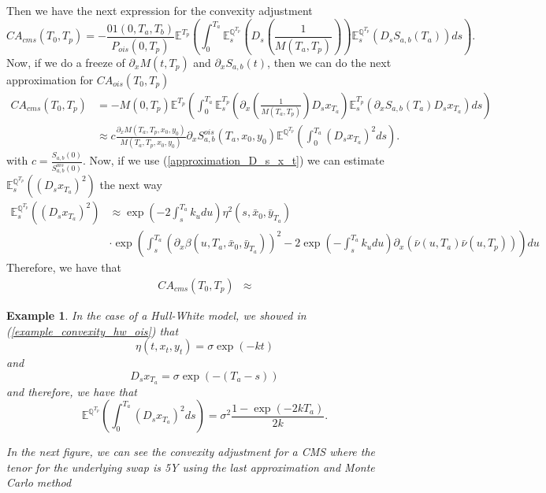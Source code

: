 \documentclass[a4paper,10pt]{article}
\newtheorem{example}[theorem]{Example}
\newcommand{\1}{\mathbf{1}}
\begin{document}
Then we have the next expression for the convexity adjustment
\begin{equation*}
CA_{cms}(T_0,T_p) = - \frac{01(0,T_a,T_b)}{P_{ois}(0,T_p)} \mathbb{E}^{T_p}\left(\int_{0}^{T_a} \mathbb{E}_s^{\mathbb{Q}^{T_p}}\left(D_s \left(\frac{1}{M(T_a,T_p)}\right)\right) \mathbb{E}_s^{\mathbb{Q}^{T_p}}\left(D_s S_{a,b}(T_a)\right) ds  \right).
\end{equation*}
Now, if we do a freeze of $\partial_x M(t,T_p)$ and $\partial_x S_{a,b}(t)$, then we can do the next approximation for $CA_{ois}(T_0,T_p)$
\begin{align*}
CA_{cms}(T_0,T_p) &=  - M(0,T_p) \mathbb{E}^{T_p}\left(\int_{0}^{T_a} \mathbb{E}^{T_p}_s \left(\partial_x \left(\frac{1}{M(T_a,T_p)}\right) D_s x_{T_a}\right) \mathbb{E}^{T_p}_s \left(\partial_x S_{a,b}(T_a)D_s x_{T_a} \right) ds \right) \\
& \approx c \frac{ \partial_x M(T_a,T_p, x_0, y_0)}{M(T_a,T_p, x_0, y_0)}  \partial_x S^{ois}_{a,b}(T_a,x_0,y_0) \mathbb{E}^{\mathbb{Q}^{T_p}}\left(\int_{0}^{T_a} \left(D_s x_{T_a} \right)^{2} ds \right).
\end{align*}
with $c = \frac{S_{a,b}(0)}{S^{ois}_{a,b}(0)}$. Now, if we use (\ref{approximation_D_s_x_t}) we can estimate  
$
 \mathbb{E}_s^{\mathbb{Q}^{T_p}}\left(\left(D_s x_{T_a} \right)^{2}\right)
$
the next way 
\begin{align*} 
\mathbb{E}_s^{\mathbb{Q}^{T_p}}\left(\left(D_s x_{T_a} \right)^{2}\right) &\approx \exp\left(-2 \int_{s}^{T_a}k_u du \right) \eta^{2}(s,\bar{x}_0,\bar{y}_{T_a}) \\
& \cdot \exp\left(\int_{s}^{T_a} \left(\partial_x \beta(u,T_a,\bar{x}_0,\bar{y}_{T_a})\right)^{2} - 2 \exp\left(-\int_{s}^{T_a}k_u du\right) \partial_x (\bar{\nu}(u,T_a) \bar{\nu}(u,T_p)) \right) du
\end{align*}
Therefore, we have that
\begin{align*}
CA_{cms}(T_0,T_p) &\approx 
\end{align*}



\begin{example}
In the case of a Hull-White model, we showed  in (\ref{example_convexity_hw_ois}) that 
$$
\eta(t,x_t, y_t) = \sigma\exp(-kt)
$$
and
$$
D_s x_{T_a} = \sigma \exp(-(T_a - s))
$$
and therefore, we have that
\begin{equation*}
\mathbb{E}^{\mathbb{Q}^{T_p}}\left(\int_{0}^{T_a}(D_s x_{T_a})^{2} ds \right) = \sigma^{2} \frac{1 - \exp(-2kT_a)}{2k}.
\end{equation*}

In the next figure, we can see the convexity adjustment for a CMS where the tenor for the underlying swap is 5Y using the last approximation and Monte Carlo method
\end{example}
\end{document}
